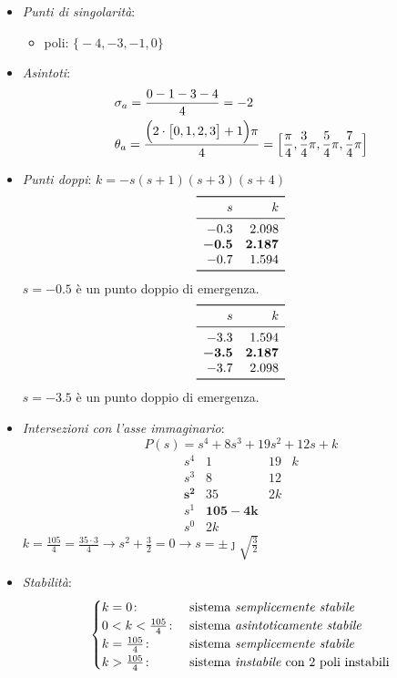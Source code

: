 \begin{esercizio}
\begin{itemize}
	\item \emph{Punti di singolarità}:
		\begin{itemize}
			\item poli: \(\bigl\{ -4,-3,-1,0 \bigr\}\)
		\end{itemize}
	\item \emph{Asintoti}:
		\begin{align*}
			& \sigma_a = \frac{0-1-3-4}{4} = -2 \\
			& \theta_a = \frac{\Bigl(2\cdot\bigl[0,1,2,3\bigr]+1\Bigr)\pi}{4} = \Bigl[ \frac{\pi}{4},\frac{3}{4}\pi,\frac{5}{4}\pi,\frac{7}{4}\pi \Bigr]
		\end{align*}
	\item \emph{Punti doppi}: \(k = -s(s+1)(s+3)(s+4)\)
		\[\begin{array}{rr}
			\toprule
			s 	  & k 		\\
			\midrule
			-0.3 	  & 2.098 	\\
			\bm{-0.5} & \bm{2.187}	\\
			-0.7 	  & 1.594	\\
			\bottomrule
		\end{array}\]
		\(s=-0.5\) è un punto doppio di emergenza.
		\[\begin{array}{rr}
			\toprule
			s 	  & k 		\\
			\midrule
			-3.3 	  & 1.594 	\\
			\bm{-3.5} & \bm{2.187} 	\\
			-3.7 	  & 2.098 	\\
			\bottomrule
		\end{array}\]
		\(s=-3.5\) è un punto doppio di emergenza.
	\item \emph{Intersezioni con l'asse immaginario}:
		\[
			P(s) = s^4 +8s^3 +19s^2 +12s +k
		\]
		\[\begin{array}{r|rrr}
			s^4 	 &  1 & 19 & k  \\
			s^3 	 &  8 & 12 	\\
			\bm{s^2} & 35 & 2k 	\\
			s^1 	 & \bm{105-4k} 	\\
			s^0 	 & 2k
		\end{array}\]
		\(k = \frac{105}{4} = \frac{35\cdot3}{4} \rightarrow s^2+\frac{3}{2} = 0 \rightarrow s = \pm\jmath\sqrt{\frac{3}{2}}\)
	\item \emph{Stabilità}:
		\[\begin{cases}
			k = 0\colon & \text{sistema \emph{semplicemente stabile}} \\
			0<k<\frac{105}{4}\colon & \text{sistema \emph{asintoticamente stabile}} \\
			k = \frac{105}{4}\colon & \text{sistema \emph{semplicemente stabile}} \\
			k > \frac{105}{4}\colon & \text{sistema \emph{instabile} con 2 poli instabili}
		\end{cases}\]
\end{itemize}


\end{esercizio}
